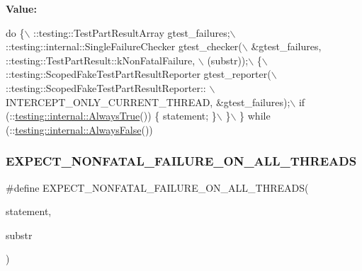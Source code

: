 {\bfseries Value\+:}
\begin{DoxyCode}
\textcolor{keywordflow}{do} \{\(\backslash\)
    ::testing::TestPartResultArray gtest\_failures;\(\backslash\)
    ::testing::internal::SingleFailureChecker gtest\_checker(\(\backslash\)
        &gtest\_failures, ::testing::TestPartResult::kNonFatalFailure, \(\backslash\)
        (substr));\(\backslash\)
    \{\(\backslash\)
      ::testing::ScopedFakeTestPartResultReporter gtest\_reporter(\(\backslash\)
          ::testing::ScopedFakeTestPartResultReporter:: \(\backslash\)
          INTERCEPT\_ONLY\_CURRENT\_THREAD, &gtest\_failures);\(\backslash\)
      if (::\hyperlink{namespacetesting_1_1internal_a4d46f09c3bfe68700b7f728d2cc3782f}{testing::internal::AlwaysTrue}()) \{ statement; \}\(\backslash\)
    \}\(\backslash\)
  \} \textcolor{keywordflow}{while} (::\hyperlink{namespacetesting_1_1internal_a4b24c851ab13569b1b15b3d259b60d2e}{testing::internal::AlwaysFalse}())
\end{DoxyCode}
\mbox{\label{gtest-spi_8h_a9f4cf1f150fe9facfc4cbf0bae646ee9}} 
\subsubsection{\texorpdfstring{E\+X\+P\+E\+C\+T\+\_\+\+N\+O\+N\+F\+A\+T\+A\+L\+\_\+\+F\+A\+I\+L\+U\+R\+E\+\_\+\+O\+N\+\_\+\+A\+L\+L\+\_\+\+T\+H\+R\+E\+A\+DS}{EXPECT\_NONFATAL\_FAILURE\_ON\_ALL\_THREADS}}
{\footnotesize\ttfamily \#define E\+X\+P\+E\+C\+T\+\_\+\+N\+O\+N\+F\+A\+T\+A\+L\+\_\+\+F\+A\+I\+L\+U\+R\+E\+\_\+\+O\+N\+\_\+\+A\+L\+L\+\_\+\+T\+H\+R\+E\+A\+DS(\begin{DoxyParamCaption}\item[{}]{statement,  }\item[{}]{substr }\end{DoxyParamCaption})}

